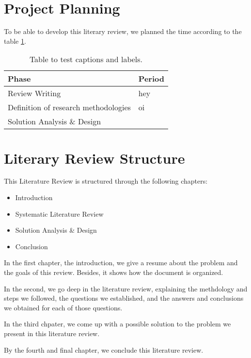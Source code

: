 \section{Project Planning}

To be able to develop this literary review, we planned the time according to the table \ref{table:1}.

\begin{table}[h!]\label{table:1}
    \centering
    \begin{tabularx}{0.8\textwidth} {
        | >{\raggedright\arraybackslash}X 
        | >{\centering\arraybackslash}X |}
        \hline
        Phase & Period \\
        \hline
        Review Writing & hey \\ 
        \hline
        Definition of research methodologies & oi \\
        \hline
        Solution Analysis \& Design & 545 \\
        \hline
    \end{tabularx}
    \caption{Table to test captions and labels.}
\end{table}



\section{Literary Review Structure}

This Literature Review is structured through the following chapters:

\begin{itemize}
    \item Introduction
    \item Systematic Literature Review
    \item Solution Analysis \& Design
    \item Conclusion
\end{itemize}    

In the first chapter, the introduction, we give a resume about the problem and the goals of this review. Besides, it shows how the document is organized.

In the second, we go deep in the literature review, explaining the methdology and steps we followed, the questions we established, and the answers and conclusions we obtained for each of those questions.

In the third chpater, we come up with a possible solution to the problem we present in this literature review.

By the fourth and final chapter, we conclude this literature review.
